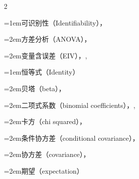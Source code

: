 \begin{multicols}{2}
\par\noindent\hangindent=1em\hspace*{0em}\label{idx:526}可识别性（Identifiability），\hyperref[def:11.2.2]{\pageref*{def:11.2.2}}\par
\par\noindent\hangindent=2em\hspace*{1em}\label{idx:527}方差分析（ANOVA），\hyperref[def:11.2.2]{\pageref*{def:11.2.2}}\par
\par\noindent\hangindent=2em\hspace*{1em}\label{idx:528}变量含误差（EIV），\hyperref[idxocc:528:501]{\pageref*{idxocc:528:501}}, \hyperref[idxocc:528:506]{\pageref*{idxocc:528:506}}\par
\par\addvspace{2pt}
\par\noindent\hangindent=1em\hspace*{0em}\label{idx:529}恒等式（Identity）\par
\par\noindent\hangindent=2em\hspace*{1em}\label{idx:530}贝塔（beta），\hyperref[idxocc:530:142]{\pageref*{idxocc:530:142}}\par
\par\noindent\hangindent=2em\hspace*{1em}\label{idx:531}二项式系数（binomial coefficients），\hyperref[exercise:1.27]{\pageref*{exercise:1.27}}, \hyperref[idxocc:531:103]{\pageref*{idxocc:531:103}}\par
\par\noindent\hangindent=2em\hspace*{1em}\label{idx:532}卡方（chi squared），\hyperref[thm:3.6.7]{\pageref*{thm:3.6.7}}\par
\par\noindent\hangindent=2em\hspace*{1em}\label{idx:533}条件协方差（conditional covariance），\hyperref[exercise:4.59]{\pageref*{exercise:4.59}}\par
\par\noindent\hangindent=2em\hspace*{1em}\label{idx:534}协方差（covariance），\hyperref[item:12.11.a]{\pageref*{item:12.11.a}}\par
{}
\par\noindent\hangindent=2em\hspace*{1em}\label{idx:535}期望（expectation）\par

\end{multicols}
